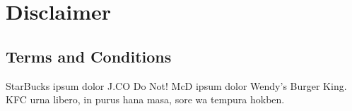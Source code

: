 \thispagestyle{plain}

\chapter*{Disclaimer}

\section*{Terms and Conditions}

StarBucks ipsum dolor J.CO Do Not!
McD ipsum dolor Wendy’s Burger King.
KFC urna libero, in purus hana masa, sore wa tempura hokben.

